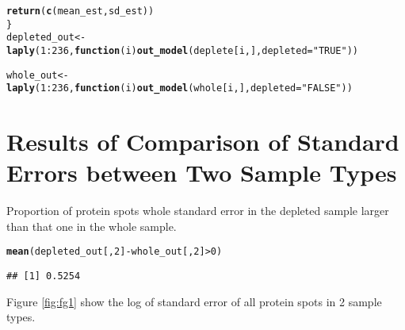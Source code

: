 \documentclass{article}\usepackage[]{graphicx}\usepackage[]{color}
\makeatletter
\newcommand{\hlnum}[1]{\textcolor[rgb]{0.686,0.059,0.569}{#1}}%
\newcommand{\hlstr}[1]{\textcolor[rgb]{0.192,0.494,0.8}{#1}}%
\newcommand{\hlopt}[1]{\textcolor[rgb]{0,0,0}{#1}}%
\newcommand{\hlstd}[1]{\textcolor[rgb]{0.345,0.345,0.345}{#1}}%
\newcommand{\hlkwa}[1]{\textcolor[rgb]{0.161,0.373,0.58}{\textbf{#1}}}%
\newcommand{\hlkwb}[1]{\textcolor[rgb]{0.69,0.353,0.396}{#1}}%
\newcommand{\hlkwc}[1]{\textcolor[rgb]{0.333,0.667,0.333}{#1}}%
\newcommand{\hlkwd}[1]{\textcolor[rgb]{0.737,0.353,0.396}{\textbf{#1}}}%
\newenvironment{kframe}{%
 \def\at@end@of@kframe{}%
 \ifinner\ifhmode%
  \def\at@end@of@kframe{\end{minipage}}%
  \begin{minipage}{\columnwidth}%
 \fi\fi%
 \def\FrameCommand##1{\hskip\@totalleftmargin \hskip-\fboxsep
 \colorbox{shadecolor}{##1}\hskip-\fboxsep
     \hskip-\linewidth \hskip-\@totalleftmargin \hskip\columnwidth}%
 \MakeFramed {\advance\hsize-\width
   \@totalleftmargin\z@ \linewidth\hsize
   \@setminipage}}%
 {\par\unskip\endMakeFramed%
 \at@end@of@kframe}
\newenvironment{knitrout}{}{} %
\makeatother
\begin{document}
\begin{knitrout}
\begin{kframe}
\begin{alltt}
  \hlkwd{return}\hlstd{(}\hlkwd{c}\hlstd{(mean_est, sd_est))}
\hlstd{\}}
\hlstd{depleted_out} \hlkwb{<-} \hlkwd{laply}\hlstd{(}\hlnum{1}\hlopt{:}\hlnum{236}\hlstd{,} \hlkwa{function}\hlstd{(}\hlkwc{i}\hlstd{)}\hlkwd{out_model}\hlstd{(deplete[i,],} \hlkwc{depleted} \hlstd{=} \hlstr{"TRUE"}\hlstd{))}

\hlstd{whole_out} \hlkwb{<-} \hlkwd{laply}\hlstd{(}\hlnum{1}\hlopt{:}\hlnum{236}\hlstd{,} \hlkwa{function}\hlstd{(}\hlkwc{i}\hlstd{)}\hlkwd{out_model}\hlstd{(whole[i,],} \hlkwc{depleted} \hlstd{=} \hlstr{"FALSE"}\hlstd{))}
\end{alltt}
\end{kframe}
\end{knitrout}



\section{Results of Comparison of Standard Errors between Two Sample Types}
Proportion of protein spots whole standard error in the depleted sample larger than that one  in the whole sample.
\begin{knitrout}
\color{fgcolor}\begin{kframe}
\begin{alltt}
\hlkwd{mean}\hlstd{(depleted_out[,} \hlnum{2}\hlstd{]} \hlopt{-} \hlstd{whole_out[,} \hlnum{2}\hlstd{]} \hlopt{>} \hlnum{0}\hlstd{)}
\end{alltt}
\begin{verbatim}
## [1] 0.5254
\end{verbatim}
\end{kframe}
\end{knitrout}


Figure \ref{fig:fg1} show the log of standard error of all protein spots in 2 sample types.
\end{document}
